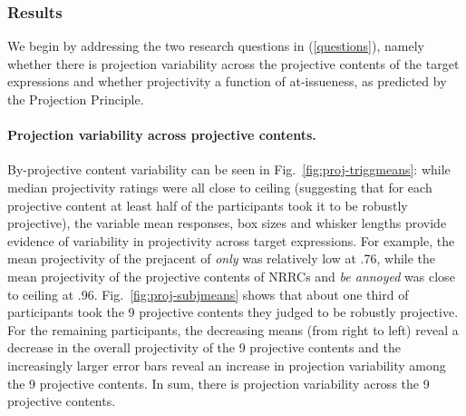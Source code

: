 \documentclass[11pt,fleqn]{article}
\newcommand{\6}{\mbox{$[\hspace*{-.6mm}[$}}
\newcommand{\9}{\mbox{$]\hspace*{-.6mm}]$}}
\newcommand{\figref}[1]{Fig.~\ref{#1}}
\begin{document}
\subsubsection{Results}

We begin by addressing the two research questions in (\ref{questions}), namely whether there is projection variability across the projective contents of the target expressions and whether projectivity a function of at-issueness, as predicted by the Projection Principle. 

\paragraph{Projection variability across projective contents.} By-projective content variability can be seen in \figref{fig:proj-triggmeans}:  while median projectivity ratings were all close to ceiling (suggesting that for each projective content at least half of the participants took it to be robustly projective), the variable mean responses, box sizes and whisker lengths provide evidence of variability in projectivity across target expressions. For example, the mean projectivity of the prejacent of \emph{only} was relatively low at .76, while the mean projectivity of the projective contents of NRRCs and \emph{be annoyed} was close to ceiling at .96. \figref{fig:proj-subjmeans} shows that about one third of participants took the 9 projective contents they judged to be robustly projective. For the remaining participants, the decreasing means (from right to left) reveal a decrease in the overall projectivity of the 9 projective contents and the increasingly larger error bars reveal an increase in projection variability among the 9 projective contents. In sum, there is projection variability across the 9 projective contents.
\end{document}
